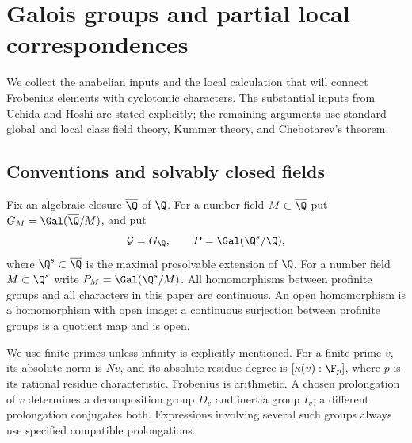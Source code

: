 \section{Galois groups and partial local correspondences}\label{sec:preliminaries}

We collect the anabelian inputs and the local calculation that will connect Frobenius elements with cyclotomic characters. The substantial inputs from Uchida and Hoshi are stated explicitly; the remaining arguments use standard global and local class field theory, Kummer theory, and Chebotarev's theorem.

\subsection{Conventions and solvably closed fields}
Fix an algebraic closure $\overline{\Q}$ of $\Q$. For a number field $M\subset\overline{\Q}$ put $G_M=\Gal(\overline{\Q}/M)$, and put
\[
 \mathcal G=G_{\Q},\qquad
 P=\Gal(\Q^s/\Q),
\]
where $\Q^s\subset\overline{\Q}$ is the maximal prosolvable extension of $\Q$. For a number field $M\subset\Q^s$ write $P_M=\Gal(\Q^s/M)$. All homomorphisms between profinite groups and all characters in this paper are continuous. An open homomorphism is a homomorphism with open image: a continuous surjection between profinite groups is a quotient map and is open.

We use finite primes unless infinity is explicitly mentioned. For a finite prime $v$, its absolute norm is $Nv$, and its absolute residue degree is $[\kappa(v):\F_p]$, where $p$ is its rational residue characteristic. Frobenius is arithmetic. A chosen prolongation of $v$ determines a decomposition group $D_v$ and inertia group $I_v$; a different prolongation conjugates both. Expressions involving several such groups always use specified compatible prolongations.

